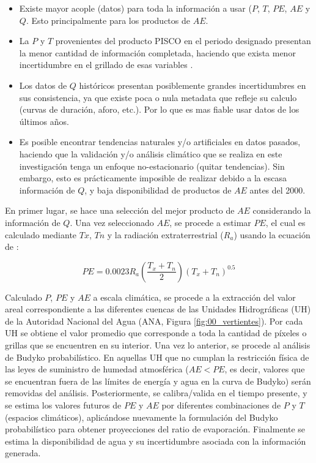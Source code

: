 \documentclass[12pt]{article}
\begin{document}
\begin{itemize}

	\item Existe mayor acople (datos) para toda la información a usar ($P$, $T$, $PE$, $AE$ y $Q$. Esto principalmente para los productos de $AE$.
	
	\item La $P$ y $T$ provenientes del producto PISCO en el periodo designado presentan la menor cantidad de información completada, haciendo que exista menor incertidumbre en el grillado de esas variables \citep{Huerta2019, Aybar2019}.
	
	\item Los datos de $Q$ históricos presentan posiblemente grandes incertidumbres en sus consistencia, ya que existe poca o nula metadata que refleje su calculo (curvas de duración, aforo, etc.). Por lo que es mas fiable usar datos de los últimos años.
	
	\item Es posible encontrar tendencias naturales y/o artificiales en datos pasados, haciendo que la validación y/o análisis climático que se realiza en este investigación tenga un enfoque no-estacionario (quitar tendencias). Sin embargo, esto es prácticamente imposible de realizar debido a la escasa información de $Q$, y baja disponibilidad de productos de $AE$ antes del 2000.
	
\end{itemize}

En primer lugar, se hace una selección del mejor producto de $AE$ considerando la información de $Q$. Una vez seleccionado $AE$, se procede a estimar $PE$, el cual es calculado mediante $Tx$, $Tn$ y la radiación extraterrestrial ($R_{a}$) usando la ecuación de \citet{Hargreaves1985}:

\begin{equation}
PE = 0.0023R_{a}\left ( \frac{T_{x}+T_{n}}{2} \right )\left ( T_{x}+T_{n} \right )^{0.5}
\end{equation}

Calculado $P$, $PE$ y $AE$ a escala climática, se procede a la extracción del valor areal correspondiente a las diferentes cuencas de las Unidades Hidrográficas (UH) de la Autoridad Nacional del Agua (ANA, Figura \ref{fig:00_vertientes}). Por cada UH se obtiene el valor promedio que corresponde a toda la cantidad de píxeles o grillas que se encuentren en su interior. Una vez lo anterior, se procede al análisis de Budyko probabilístico. En aquellas UH que no cumplan la restricción física de las leyes de suministro de humedad atmosférica ($AE < PE$, es decir, valores que se encuentran fuera de las límites de energía y agua en la curva de Budyko) serán removidas del análisis. Posteriormente, se calibra/valida en el tiempo presente, y se estima los valores futuros de $PE$ y $AE$ por diferentes combinaciones de $P$ y $T$ (espacios climáticos), aplicándose nuevamente la formulación del Budyko probabilístico para obtener proyecciones del ratio de evaporación. Finalmente se estima la disponibilidad de agua y su incertidumbre asociada con la información generada.
\end{document}
